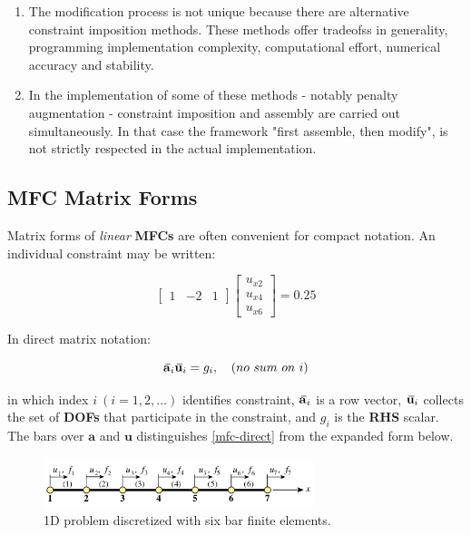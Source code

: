 \documentclass[10pt,b5paper,titlepage]{book}
\newcommand{\m}{\mathbf}
\newcommand{\closure}[2][3]{%
{}\mkern#1mu\overline{\mkern-#1mu#2}}
\begin{document}
\begin{enumerate}
    \item The modification process is not unique because there are alternative
        constraint imposition methods. These methods offer tradeofss in generality,
        programming implementation complexity, computational effort, numerical
        accuracy and stability.

    \item In the implementation of some of these methods - notably penalty augmentation
        - constraint imposition and assembly are carried out simultaneously. In that
        case the framework "first assemble, then modify", is not strictly respected
        in the actual implementation.
\end{enumerate}


\subsection{MFC Matrix Forms}

Matrix forms of \textit{linear} \textbf{MFCs} are often convenient for compact
notation. An individual constraint may be written:

\begin{equation}\label{mfc-matrix}
    \begin{bmatrix}
        1 & -2 & 1
    \end{bmatrix}
    \begin{bmatrix}
        u_{x2} \\
        u_{x4} \\
        u_{x6}
    \end{bmatrix}
    = 0.25
\end{equation}

In direct matrix notation:

\begin{equation}\label{mfc-direct}
    \closure{\m{a}}_i \closure{\m{u}}_i = g_i, \quad (no\ sum\ on\ i)
\end{equation}

in which index $ i\ (i = 1, 2,\dots) $ identifies constraint, $ \closure{\m{a}}_i $
is a row vector, $ \closure{\m{u}}_i $ collects the set of \textbf{DOFs}
that participate in the constraint, and $ g_i $ is the \textbf{RHS} scalar.
The bars over $ \m{a} $ and $ \m{u} $ distinguishes
\eqref{mfc-direct} from the expanded form below.

\begin{figure}[ht]
    \centering
    \includegraphics[width=0.70\textwidth]{img/1D_mfc_bar.png}
    \caption{1D problem discretized with six bar finite elements.}
    \label{fig:1D-MFC-bar-png}
\end{figure}
\end{document}
